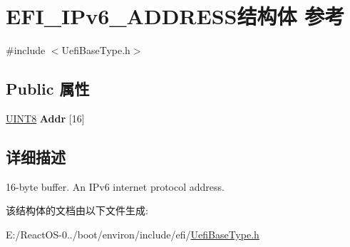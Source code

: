 \hypertarget{struct_e_f_i___i_pv6___a_d_d_r_e_s_s}{}\section{E\+F\+I\+\_\+\+I\+Pv6\+\_\+\+A\+D\+D\+R\+E\+S\+S结构体 参考}
\label{struct_e_f_i___i_pv6___a_d_d_r_e_s_s}


{\ttfamily \#include $<$Uefi\+Base\+Type.\+h$>$}

\subsection*{Public 属性}
\begin{DoxyCompactItemize}
\item 
\mbox{\label{struct_e_f_i___i_pv6___a_d_d_r_e_s_s_a313078fb120412f064a4022b9b6c3020}} 
\hyperlink{_processor_bind_8h_ab27e9918b538ce9d8ca692479b375b6a}{U\+I\+N\+T8} {\bfseries Addr} \mbox{[}16\mbox{]}
\end{DoxyCompactItemize}


\subsection{详细描述}
16-\/byte buffer. An I\+Pv6 internet protocol address. 

该结构体的文档由以下文件生成\+:\begin{DoxyCompactItemize}
\item 
E\+:/\+React\+O\+S-\/0../boot/environ/include/efi/\hyperlink{_uefi_base_type_8h}{Uefi\+Base\+Type.\+h}\end{DoxyCompactItemize}
